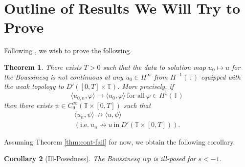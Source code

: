 \documentclass[12pt,reqno]{amsart}
\numberwithin{equation}{section}  %
\newcommand{\ci}{\mathbb{T}}
\newcommand{\vp}{\varphi}
\newtheorem{theorem}{Theorem}[section]
\newtheorem{corollary}[theorem]{Corollary}
\begin{document}
  

  
  \section{Outline of Results We Will Try to Prove}
        \label{sec:outline-bous}
        Following \cite{Molinet:2011uq}, we wish to prove the following.
        \begin{theorem}
          \label{thm:cont-fail-bous}
        There exists $T > 0$ such that the data to solution map $u_{0} \mapsto u$ for
        the Boussinesq is not continuous at any $u_{0} \in H^{\infty}$ from $H^{-1}(\ci)$
        equipped with the weak topology to $D'\left([0, T] \times \ci
        \right)$. More precisely, if 
        \begin{equation}
          \langle u_{0,n}, \vp \rangle  \to \langle u_{0}, \vp \rangle  \ 
          \text{for all} \ \vp \in H^{1}(\ci)
        \end{equation}
        then there exists $\psi \in C^{\infty}_{0}(\ci \times \left[ 0, T
        \right])$ such that
        \begin{gather*}
           \langle u_{n}, \psi \rangle  \not \to \langle u, \psi \rangle 
          \\
          (\text{i.e.} \ u_{n} \not \to u \ \text{in} \ D'\left( \ci \times [0,T]
          \right)).
        \end{gather*}
        \end{theorem}
    Assuming Theorem \ref{thm:cont-fail} for now, we obtain the following
    corollary.
    \begin{corollary}[Ill-Posedness]
   The Boussinesq ivp is ill-posed for $s < -1$.  
    \label{prop:ill-pos-bous}
    \end{corollary}
\end{document}

